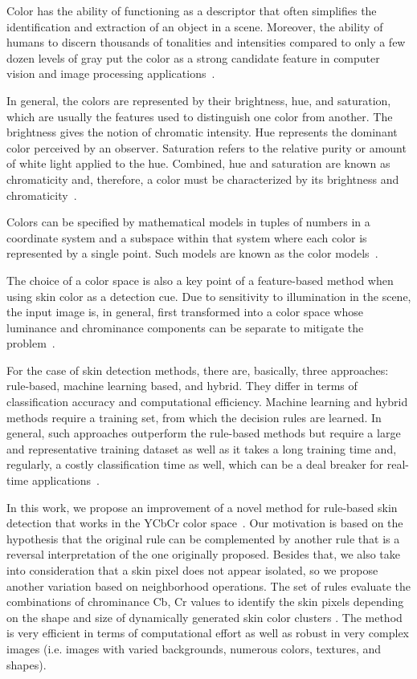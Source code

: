 Color has the ability of functioning as a descriptor that often simplifies the identification and extraction of an object in a scene. Moreover, the ability of humans to discern thousands of tonalities and intensities compared to only a few dozen levels of gray put the color as a strong candidate feature in computer vision and image processing applications~\citep{gonzalez:02}.

In general, the colors are represented by their brightness, hue, and saturation, which are usually the features used to distinguish one color from another. The brightness gives the notion of chromatic intensity. Hue represents the dominant color perceived by an observer. Saturation refers to the relative purity or amount of white light applied to the hue. Combined, hue and saturation are known as chromaticity and, therefore, a color must be characterized by its brightness and chromaticity~\citep{gonzalez:02}.

Colors can be specified by mathematical models in tuples of numbers in a coordinate system and a subspace within that system where each color is represented by a single point. Such models are known as the color models~\citep{gonzalez:02}.

The choice of a color space is also a key point of a feature-based method when using skin color as a detection cue. Due to sensitivity to illumination in the scene, the input image is, in general, first transformed into a color space whose luminance and chrominance components can be separate to mitigate the problem~\citep{vezhnevets:03}.

For the case of skin detection methods, there are, basically, three approaches: rule-based, machine learning based, and hybrid. They differ in terms of classification accuracy and computational efficiency. Machine learning and hybrid methods require a training set, from which the decision rules are learned. In general, such approaches outperform the rule-based methods but require a large and representative training dataset as well as it takes a long training time and, regularly, a costly classification time as well, which can be a deal breaker for real-time applications~\citep{kakumanu:07}.

In this work, we propose an improvement of a novel method for rule-based skin detection that works in the YCbCr color space~\citep{brancati:17}. Our motivation is based on the hypothesis that the original rule can be complemented by another rule that is a reversal interpretation of the one originally proposed. Besides that, we also take into consideration that a skin pixel does not appear isolated, so we propose another variation based on neighborhood operations. The set of rules evaluate the combinations of chrominance Cb, Cr values to identify the skin pixels depending on the shape and size of dynamically generated skin color clusters \citep{brancati:17}. The method is very efficient in terms of computational effort as well as robust in very complex images (i.e. images with varied backgrounds, numerous colors, textures, and shapes).


